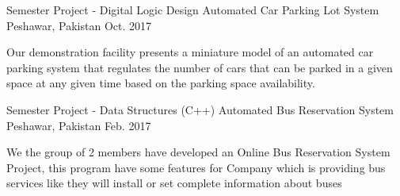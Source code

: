 \begin{cventries}



\cventry
{Semester Project - Digital Logic Design } %
{Automated Car Parking Lot System} %
{Peshawar, Pakistan} %
{Oct. 2017} %
{ %
\begin{cvitems}
\item {Our demonstration facility presents a miniature model of an automated car parking system that regulates the number of cars that can be parked in a given space at any given time based on the parking space availability.
}
\end{cvitems}
}


\cventry
{Semester Project - Data Structures (C++) } %
{Automated Bus Reservation System} %
{Peshawar, Pakistan} %
{Feb. 2017} %
{ %
\begin{cvitems}
\item {We the group of 2 members have developed an Online Bus Reservation System Project, this program have some features for Company which is providing bus services like they will install or set complete information about buses
}
\end{cvitems}
}


\end{cventries}

